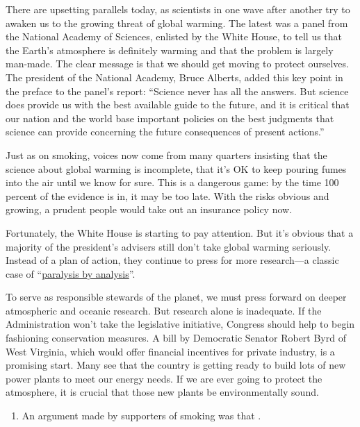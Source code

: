 {There are upsetting parallels today, as scientists in one wave after
another try to awaken us to the growing threat of global warming. The
latest was a panel from the National Academy of Sciences, enlisted by
the White House, to tell us that the Earth's atmosphere is definitely
warming and that the problem is largely man-made. The clear message is
that we should get moving to protect ourselves. The president of the
National Academy, Bruce Alberts, added this key point in the preface to
the panel's report: ``Science never has all the answers. But science
does provide us with the best available guide to the future, and it is
critical that our nation and the world base important policies on the
best judgments that science can provide concerning the future
consequences of present actions.''

Just as on smoking, voices now come from many quarters insisting that
the science about global warming is incomplete, that it's OK to keep
pouring fumes into the air until we know for sure. This is a dangerous
game: by the time 100 percent of the evidence is in, it may be too late.
With the risks obvious and growing, a prudent people would take out an
insurance policy now.

Fortunately, the White House is starting to pay attention. But it's
obvious that a majority of the president's advisers still don't take
global warming seriously. Instead of a plan of action, they continue to
press for more research---a classic case of ``\uline{paralysis by analysis}''.

To serve as responsible stewards of the planet, we must press forward on
deeper atmospheric and oceanic research. But research alone is
inadequate. If the Administration won't take the legislative initiative,
Congress should help to begin fashioning conservation measures. A bill
by Democratic Senator Robert Byrd of West Virginia, which would offer
financial incentives for private industry, is a promising start. Many
see that the country is getting ready to build lots of new power plants
to meet our energy needs. If we are ever going to protect the
atmosphere, it is crucial that those new plants be environmentally
sound.


\begin{enumerate}[resume]
	\item
An argument made by supporters of smoking was that \lineread.



\end{enumerate}}
